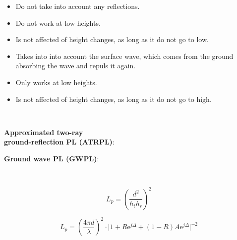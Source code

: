 \documentclass[a0paper,landscape]{baposter}
\begin{document}
\begin{poster}
{\begin{minipage}{.5\textwidth}
\begin{itemize}
\item Do not take into account any reflections.
\item Do not work at low heights.
\item Is not affected of height changes, as long as it do not go to low.
\end{itemize}
\end{minipage}%
\begin{minipage}{0.5\textwidth}
\begin{itemize}
\item Takes into into account the surface wave, which comes from the ground absorbing the wave and repuls it again.
\item Only works at low heights.
\item Is not affected of height changes, as long as it do not go to high.
\end{itemize}
\end{minipage} \\

\vspace{0.3in} 

\begin{minipage}{.5\textwidth}
\textcolor{thomasblue}{\textbf{Approximated two-ray}}\\
\textcolor{thomasblue}{\textbf{ground-reflection PL (ATRPL)}:}
\end{minipage}%
\begin{minipage}{0.5\textwidth}
\textcolor{thomaspurple}{\textbf{Ground wave PL (GWPL)}:}
\end{minipage} \\



\begin{minipage}{.5\textwidth}
\begin{equation*}
L_{p} = \left(\frac{d^2}{h_t h_r}\right)^2
\label{two_ray_model}
\end{equation*}
\end{minipage}%
\begin{minipage}{0.5\textwidth}
\begin{equation*}
L_p=\left(\frac{4 \pi d}{\lambda}\right)^2 \cdot \Big|1+R\text{e}^{j\Delta}+(1-R)A\text{e}^{j\Delta}\Big|^{-2} 
\label{ground_wave}
\end{equation*}
\end{minipage} \\

}
\end{poster}
\end{document}
